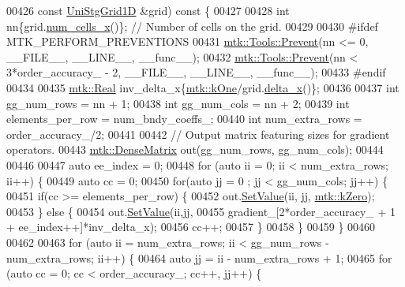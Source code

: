 \begin{DoxyCode}
{{00426   \textcolor{keyword}{const} \hyperlink{classmtk_1_1UniStgGrid1D}{UniStgGrid1D} &grid)\textcolor{keyword}{ const }\{
00427 
00428   \textcolor{keywordtype}{int} nn\{grid.\hyperlink{classmtk_1_1UniStgGrid1D_af1b3729d8afa07be5b2775ed68015b80}{num\_cells\_x}()\}; \textcolor{comment}{// Number of cells on the grid.}
00429 
00430 \textcolor{preprocessor}{  #ifdef MTK\_PERFORM\_PREVENTIONS}
00431   \hyperlink{classmtk_1_1Tools_a332324c6f25e66be9dff48c5987a3b9f}{mtk::Tools::Prevent}(nn <= 0, \_\_FILE\_\_, \_\_LINE\_\_, \_\_func\_\_);
00432   \hyperlink{classmtk_1_1Tools_a332324c6f25e66be9dff48c5987a3b9f}{mtk::Tools::Prevent}(nn < 3*order\_accuracy\_ - 2, \_\_FILE\_\_, \_\_LINE\_\_, \_\_func\_\_);
00433 \textcolor{preprocessor}{  #endif}
00434 
00435   \hyperlink{group__c01-roots_gac080bbbf5cbb5502c9f00405f894857d}{mtk::Real} inv\_delta\_x\{\hyperlink{group__c01-roots_ga26407c24d43b6b95480943340d285c71}{mtk::kOne}/grid.\hyperlink{classmtk_1_1UniStgGrid1D_a6e7173b01241632cf509496d66b9f74c}{delta\_x}()\};
00436 
00437   \textcolor{keywordtype}{int} gg\_num\_rows = nn + 1;
00438   \textcolor{keywordtype}{int} gg\_num\_cols = nn + 2;
00439   \textcolor{keywordtype}{int} elements\_per\_row = num\_bndy\_coeffs\_;
00440   \textcolor{keywordtype}{int} num\_extra\_rows = order\_accuracy\_/2;
00441 
00442   \textcolor{comment}{// Output matrix featuring sizes for gradient operators.}
00443   \hyperlink{classmtk_1_1DenseMatrix}{mtk::DenseMatrix} out(gg\_num\_rows, gg\_num\_cols);
00444 
00446 
00447   \textcolor{keyword}{auto} ee\_index = 0;
00448   \textcolor{keywordflow}{for} (\textcolor{keyword}{auto} ii = 0; ii < num\_extra\_rows; ii++) \{
00449     \textcolor{keyword}{auto} cc = 0;
00450     \textcolor{keywordflow}{for}(\textcolor{keyword}{auto} jj = 0 ; jj < gg\_num\_cols; jj++) \{
00451       \textcolor{keywordflow}{if}(cc >= elements\_per\_row) \{
00452         out.\hyperlink{classmtk_1_1DenseMatrix_a784ce5784109ac86bfb9d8562b334b13}{SetValue}(ii, jj, \hyperlink{group__c01-roots_ga59a451a5fae30d59649bcda274fea271}{mtk::kZero});
00453       \} \textcolor{keywordflow}{else} \{
00454         out.\hyperlink{classmtk_1_1DenseMatrix_a784ce5784109ac86bfb9d8562b334b13}{SetValue}(ii,jj,
00455                      gradient\_[2*order\_accuracy\_ + 1 + ee\_index++]*inv\_delta\_x);
00456         cc++;
00457       \}
00458     \}
00459   \}
00460 
00462 
00463   \textcolor{keywordflow}{for} (\textcolor{keyword}{auto} ii = num\_extra\_rows; ii < gg\_num\_rows - num\_extra\_rows; ii++) \{
00464     \textcolor{keyword}{auto} jj = ii - num\_extra\_rows + 1;
00465     \textcolor{keywordflow}{for} (\textcolor{keyword}{auto} cc = 0; cc < order\_accuracy\_; cc++, jj++) \{
}}
\end{DoxyCode}
